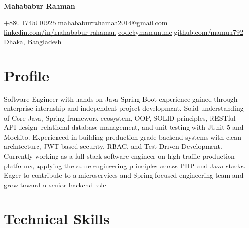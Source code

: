 \documentclass[a4paper,10.5pt]{article}
\begin{document}
{\LARGE\bfseries Mahababur Rahman}

\vspace{4pt}
{\small
+880 1745010925 \quad
\href{mailto:mahababurrahaman2014@gmail.com}{mahababurrahaman2014@gmail.com} \quad
\href{https://linkedin.com/in/mahababur-rahaman}{linkedin.com/in/mahababur-rahaman} \quad
\href{https://codebymamun.me}{codebymamun.me} \quad
\href{https://github.com/mamun792}{github.com/mamun792} \quad
Dhaka, Bangladesh
}

\vspace{4pt}

\section{Profile}
\vspace{2pt}

Software Engineer with hands-on Java Spring Boot experience gained through enterprise internship and independent project development. Solid understanding of Core Java, Spring framework ecosystem, OOP, SOLID principles, RESTful API design, relational database management, and unit testing with JUnit 5 and Mockito. Experienced in building production-grade backend systems with clean architecture, JWT-based security, RBAC, and Test-Driven Development. Currently working as a full-stack software engineer on high-traffic production platforms, applying the same engineering principles across PHP and Java stacks. Eager to contribute to a microservices and Spring-focused engineering team and grow toward a senior backend role.

\vspace{2pt}

\section{Technical Skills}
\vspace{2pt}
\end{document}
